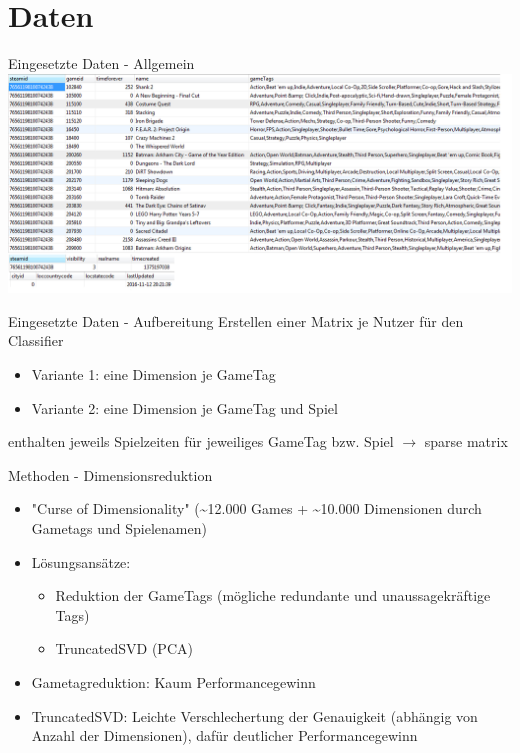\documentclass[12pt]{beamer}
\begin{document}
\section{Daten}
\begin{frame}{Eingesetzte Daten - Allgemein}
	\includegraphics[scale=0.5]{img/steam_richard_info.png}
\end{frame}


\begin{frame}{Eingesetzte Daten - Aufbereitung}
	Erstellen einer Matrix je Nutzer für den Classifier
	\begin{itemize}
		\item Variante 1: eine Dimension je GameTag
		\item Variante 2: eine Dimension je GameTag und Spiel
	\end{itemize}
	enthalten jeweils Spielzeiten für jeweiliges GameTag bzw. Spiel
	$\rightarrow$ sparse matrix
	
\end{frame}


\begin{frame}{Methoden - Dimensionsreduktion}
	\begin{itemize}
	\item "Curse of Dimensionality" (\textasciitilde 12.000 Games + \textasciitilde 10.000 Dimensionen durch Gametags und Spielenamen)
	\item Lösungsansätze:
		\begin{itemize}
		\item Reduktion der GameTags (mögliche redundante und unaussagekräftige Tags)
		\item TruncatedSVD (PCA)
		\end{itemize}
	\item Gametagreduktion: Kaum Performancegewinn
	\item TruncatedSVD: Leichte Verschlechertung der Genauigkeit (abhängig von Anzahl der Dimensionen), dafür deutlicher Performancegewinn
	\end{itemize}
\end{frame}
\end{document}
